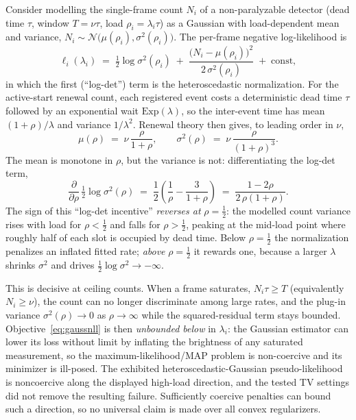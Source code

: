 \documentclass[10pt]{article}
\begin{document}
Consider modelling the single-frame count $N_i$ of a non-paralyzable detector
(dead time $\tau$, window $T=\nu\tau$, load $\rho_i=\lambda_i\tau$) as a Gaussian
with load-dependent mean and variance, $N_i\sim\mathcal{N}\!\big(\mu(\rho_i),
\sigma^2(\rho_i)\big)$. The per-frame negative log-likelihood is
\begin{equation}
  \ell_i(\lambda_i) \;=\; \tfrac12\log\sigma^2(\rho_i)
  \;+\; \frac{\big(N_i-\mu(\rho_i)\big)^2}{2\,\sigma^2(\rho_i)}
  \;+\; \mathrm{const},
  \label{eq:gaussnll}
\end{equation}
in which the first (``log-det'') term is the heteroscedastic normalization. For
the active-start renewal count, each registered event costs a deterministic dead
time $\tau$ followed by an exponential wait $\mathrm{Exp}(\lambda)$, so the
inter-event time has mean $(1+\rho)/\lambda$ and variance $1/\lambda^2$. Renewal
theory then gives, to leading order in $\nu$,
\begin{equation}
  \mu(\rho) \;=\; \nu\,\frac{\rho}{1+\rho},
  \qquad
  \sigma^2(\rho) \;=\; \nu\,\frac{\rho}{(1+\rho)^3}.
  \label{eq:meanvar}
\end{equation}
The mean is monotone in $\rho$, but the variance is not: differentiating the
log-det term,
\begin{equation}
  \frac{\partial}{\partial\rho}\,\tfrac12\log\sigma^2(\rho)
  \;=\; \frac{1}{2}\left(\frac{1}{\rho}-\frac{3}{1+\rho}\right)
  \;=\; \frac{1-2\rho}{2\,\rho(1+\rho)}.
  \label{eq:logdetderiv}
\end{equation}
The sign of this ``log-det incentive'' \emph{reverses at} $\rho=\tfrac12$: the
modelled count variance rises with load for $\rho<\tfrac12$ and falls for
$\rho>\tfrac12$, peaking at the mid-load point where roughly half of each slot is
occupied by dead time. Below $\rho=\tfrac12$ the normalization penalizes an
inflated fitted rate; \emph{above} $\rho=\tfrac12$ it rewards one, because a
larger $\lambda$ shrinks $\sigma^2$ and drives $\tfrac12\log\sigma^2\to-\infty$.

This is decisive at ceiling counts. When a frame saturates, $N_i\tau\ge T$
(equivalently $N_i\ge\nu$), the count can no longer discriminate among large
rates, and the plug-in variance $\sigma^2(\rho)\to0$ as $\rho\to\infty$ while the
squared-residual term stays bounded. Objective~\eqref{eq:gaussnll} is then
\emph{unbounded below} in $\lambda_i$: the Gaussian estimator can lower its loss
without limit by inflating the brightness of any saturated measurement, so the
maximum-likelihood/MAP problem is non-coercive and its minimizer is ill-posed.
The exhibited heteroscedastic-Gaussian pseudo-likelihood is noncoercive along
the displayed high-load direction, and the tested TV settings did not remove
the resulting failure. Sufficiently coercive penalties can bound such a
direction, so no universal claim is made over all convex regularizers.
\end{document}
